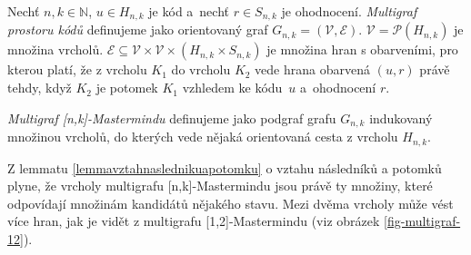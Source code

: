 \begin{definice}
  Nechť $n, k\in \mathbb{N}$, $u\in H_{n,k}$ je kód a~nechť $r\in S_{n,k}$ je ohodnocení. \emph{Multigraf prostoru kódů} definujeme jako orientovaný graf $G_{n,k} = (\mathcal{V}, \mathcal{E})$. $\mathcal{V} = \mathcal{P}(H_{n,k})$ je množina vrcholů. $\mathcal{E} \subseteq \mathcal{V} \times \mathcal{V} \times (H_{n,k}\times S_{n,k})$ je množina hran s obarveními, pro kterou platí, že z vrcholu $K_1$ do vrcholu $K_2$ vede hrana obarvená $(u,r)$ právě tehdy, když $K_2$ je potomek $K_1$ vzhledem ke kódu~$u$ a~ohodnocení $r$. 
\end{definice}


\begin{definice}
  \emph{Multigraf [n,k]-Mastermindu} definujeme jako podgraf grafu $G_{n,k}$ indukovaný množinou vrcholů, do kterých vede nějaká orientovaná cesta z vrcholu $H_{n,k}$. 
  
\end{definice}
Z lemmatu \ref{lemmavztahnaslednikuapotomku} o vztahu následníků a potomků plyne, že vrcholy multigrafu [n,k]-Mastermindu jsou právě ty množiny, které odpovídají množinám kandidátů nějakého stavu. Mezi dvěma vrcholy může vést více hran, jak je vidět z multigrafu [1,2]-Mastermindu (viz obrázek \ref{fig-multigraf-12}).


